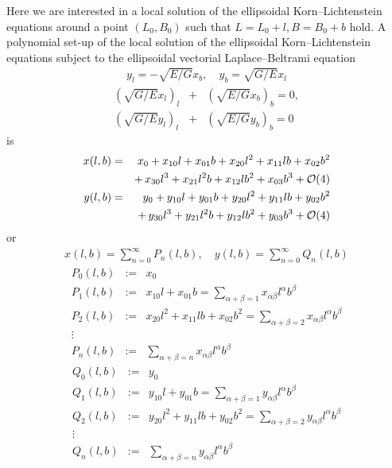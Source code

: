 \documentclass[jog]{svjour}
\begin{document}
Here we are interested in a local solution of the ellipsoidal
Korn--Lichtenstein equations around a point $(L_0,B_0)$ such that
$L=L_0+l, B=B_0+b$ hold. A polynomial set-up of the local solution of
the ellipsoidal Korn--Lichtenstein equations subject to the ellipsoidal
vectorial Laplace--Beltrami equation
\setcounter{equation}{0}%
\renewcommand{\theequation}{6\alph{equation}}%
\begin{eqnarray}
y_l=-\sqrt{E/G}x_b, \quad
y_b=\sqrt{G/E}x_l
\label{eq:6a}
\end{eqnarray}
\begin{eqnarray}
(\sqrt{G/E}x_l)_l &+ &(\sqrt{E/G}x_b)_b=0, \nonumber \\
(\sqrt{G/E}y_l)_l &+ &(\sqrt{E/G}y_b)_b=0
\label{eq:6b}
\end{eqnarray}
is
\setcounter{equation}{0}%
\renewcommand{\theequation}{7\alph{equation}}%
\begin{eqnarray}
x(l,b) &= &x_0+x_{10}l+x_{01}b+x_{20}l^2+x_{11}lb+x_{02}b^2
\nonumber\\
& &+\,x_{30}l^3+x_{21}l^2b+x_{12}lb^2+x_{03}b^3+{\cal O}(4)
\label{eq:7a}\\
y(l,b) &= &y_0+y_{10}l+y_{01}b+y_{20}l^2+y_{11}lb+y_{02}b^2
\nonumber\\
& &+\,y_{30}l^3+y_{21}l^2b+y_{12}lb^2+y_{03}b^3+{\cal O}(4)
\label{eq:7b}
\end{eqnarray}
or
\begin{eqnarray}
x(l,b)=\sum_{n=0}^{\infty}P_n(l,b), \quad
y(l,b)=\sum_{n=0}^{\infty}Q_n(l,b)
\label{eq:7c}
\end{eqnarray}
\begin{eqnarray}
P_0(l,b) & := & x_0\nonumber\\
P_1(l,b) & := & x_{10}l+x_{01}b=\sum_{\alpha+\beta=1}x_{\alpha\beta}l^\alpha b^\beta\nonumber\\
P_2(l,b) & := & x_{20}l^2+x_{11}lb+x_{02}b^2=\sum_{\alpha+\beta=2}x_{\alpha\beta}l^\alpha b^\beta\nonumber\\
\vdots & & \nonumber\\
P_n(l,b) & := & \sum_{\alpha+\beta=n}x_{\alpha\beta}l^\alpha b^\beta
\label{eq:7d}
\end{eqnarray}
\begin{eqnarray}
Q_0(l,b) & := & y_0\nonumber\\
Q_1(l,b) & := & y_{10}l+y_{01}b=\sum_{\alpha+\beta=1}y_{\alpha\beta}l^\alpha b^\beta\nonumber\\
Q_2(l,b) & := & y_{20}l^2+y_{11}lb+y_{02}b^2=\sum_{\alpha+\beta=2}y_{\alpha\beta}l^\alpha b^\beta\nonumber\\
\vdots & &\nonumber\\
Q_n(l,b) & :=& \sum_{\alpha+\beta=n}y_{\alpha\beta}l^\alpha b^\beta
\label{eq:7e}
\end{eqnarray}
\end{document}
